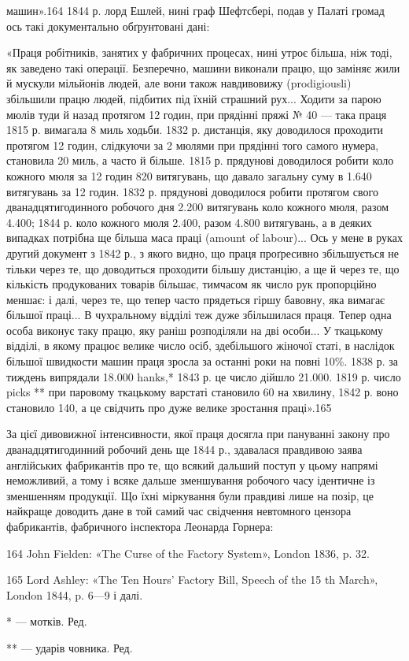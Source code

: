 машин».164 1844 р. лорд Ешлей, нині граф Шефтсбері, подав
у Палаті громад ось такі документально обґрунтовані дані:

«Праця робітників, занятих у фабричних процесах, нині утроє
більша, ніж тоді, як заведено такі операції. Безперечно, машини
виконали працю, що заміняє жили й мускули мільйонів людей,
але вони також навдивовижу (prodigiousli) збільшили працю
людей, підбитих під їхній страшний рух... Ходити за парою
мюлів туди й назад протягом 12 годин, при прядінні пряжі
№ 40 — така праця 1815 р. вимагала 8 миль ходьби. 1832 р.
дистанція, яку доводилося проходити протягом 12 годин, слідкуючи
за 2 мюлями при прядінні того самого нумера, становила
20 миль, а часто й більше. 1815 р. прядунові доводилося робити
коло кожного мюля за 12 годин 820 витягувань, що давало загальну
суму в 1.640 витягувань за 12 годин. 1832 р. прядунові
доводилося робити протягом свого дванадцятигодинного робочого
дня 2.200 витягувань коло кожного мюля, разом 4.400; 1844 р.
коло кожного мюля 2.400, разом 4.800 витягувань, а в деяких
випадках потрібна ще більша маса праці (amount of labour)...
Ось у мене в руках другий документ з 1842 р., з якого видно,
що праця проґресивно збільшується не тільки через те, що доводиться
проходити більшу дистанцію, а ще й через те, що кількість
продукованих товарів більшає, тимчасом як число рук пропорційно
меншає: і далі, через те, що тепер часто прядеться гіршу
бавовну, яка вимагає більшої праці... В чухральному відділі
теж дуже збільшилася праця. Тепер одна особа виконує таку
працю, яку раніш розподіляли на дві особи... У ткацькому відділі,
в якому працює велике число осіб, здебільшого жіночої
статі, в наслідок більшої швидкости машин праця зросла за
останні роки на повні 10\%. 1838 р. за тиждень випрядали 18.000
hanks,* 1843 р. це число дійшло 21.000. 1819 р. число picks **
при паровому ткацькому варстаті становило 60 на хвилину, 1842 р.
воно становило 140, а це свідчить про дуже велике зростання
праці».165

За цієї дивовижної інтенсивности, якої праця досягла при пануванні
закону про дванадцятигодинний робочий день ще 1844 р.,
здавалася правдивою заява англійських фабрикантів про те,
що всякий дальший поступ у цьому напрямі неможливий, а
тому і всяке дальше зменшування робочого часу ідентичне із
зменшенням продукції. Що їхні міркування були правдиві лише
на позір, це найкраще доводить дане в той самий час свідчення
невтомного цензора фабрикантів, фабричного інспектора Леонарда
Горнера:

164 John Fielden: «The Curse of the Factory System», London
1836, p. 32.

165 Lord Ashley: «The Ten Hours’ Factory Bill, Speech of the 15 th
March», London 1844, p. 6—9 і далі.

* — мотків. Ред.

** — ударів човника. Ред.
